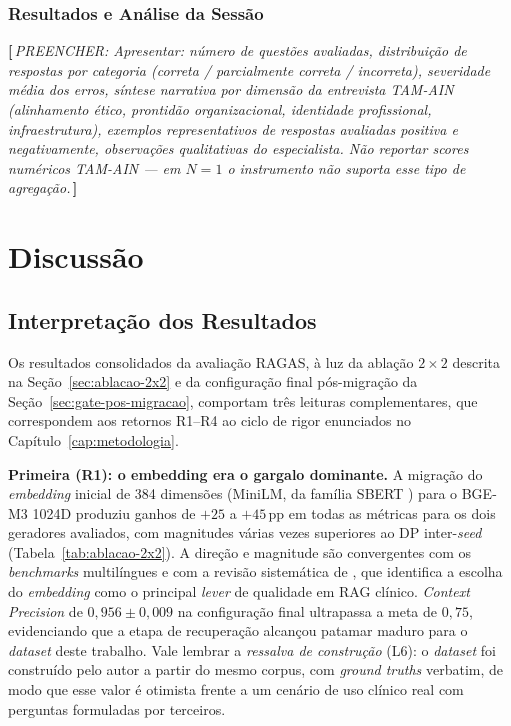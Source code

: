 \documentclass[
  12pt,
  oneside,
  a4paper,
  english,
  brazil
]{abntex2}
\newcommand{\aluno}[1]{{\color{olive!80!black}\textbf{[\,}{\small\itshape PREENCHER: #1}\textbf{\,]}}}
\begin{document}
\subsection{Resultados e Análise da Sessão}

\aluno{Apresentar: número de questões avaliadas, distribuição de respostas por
categoria (correta / parcialmente correta / incorreta), severidade média dos erros,
síntese narrativa por dimensão da entrevista TAM-AIN (alinhamento ético,
prontidão organizacional, identidade profissional, infraestrutura), exemplos
representativos de respostas avaliadas positiva e negativamente, observações
qualitativas do especialista. Não reportar \emph{scores} numéricos TAM-AIN ---
em $N=1$ o instrumento não suporta esse tipo de agregação.}

\chapter{Discussão}
\label{cap:discussao}

\section{Interpretação dos Resultados}

Os resultados consolidados da avaliação RAGAS, à luz da ablação
$2 \times 2$ descrita na Seção~\ref{sec:ablacao-2x2} e da configuração
final pós-migração da Seção~\ref{sec:gate-pos-migracao}, comportam
três leituras complementares, que correspondem aos retornos
R1--R4 ao ciclo de rigor enunciados no
Capítulo~\ref{cap:metodologia}.

\textbf{Primeira (R1): o embedding era o gargalo dominante.} A migração do
\emph{embedding} inicial de 384 dimensões (MiniLM, da família SBERT
\cite{reimers2019}) para o BGE-M3 1024D produziu ganhos de $+25$ a
$+45$\,pp em todas as métricas para os dois geradores avaliados, com
magnitudes várias vezes superiores ao DP inter-\emph{seed}
(Tabela~\ref{tab:ablacao-2x2}). A direção e magnitude são convergentes
com os \textit{benchmarks} multilíngues \cite{SHTI2023, mmteb2025} e
com a revisão sistemática de \citeauthor{ocaf2024} \cite{ocaf2024},
que identifica a escolha do \emph{embedding} como o principal
\emph{lever} de qualidade em RAG clínico. \textit{Context Precision}
de $0{,}956 \pm 0{,}009$ na configuração final ultrapassa a meta de
$0{,}75$, evidenciando que a etapa de recuperação alcançou patamar
maduro para o \emph{dataset} deste trabalho. Vale lembrar a
\emph{ressalva de construção} (L6): o \emph{dataset} foi construído
pelo autor a partir do mesmo corpus, com \emph{ground truths} verbatim,
de modo que esse valor é otimista frente a um cenário de uso clínico
real com perguntas formuladas por terceiros.
\end{document}
